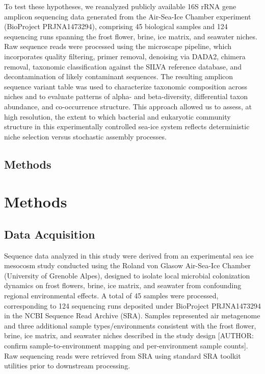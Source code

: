 \documentclass[
  11pt,
]{article}
\begin{document}
To test these hypotheses, we reanalyzed publicly available 16S rRNA gene
amplicon sequencing data generated from the Air-Sea-Ice Chamber
experiment (BioProject PRJNA1473294), comprising 45 biological samples
and 124 sequencing runs spanning the frost flower, brine, ice matrix,
and seawater niches. Raw sequence reads were processed using the
microscape pipeline, which incorporates quality filtering, primer
removal, denoising via DADA2, chimera removal, taxonomic classification
against the SILVA reference database, and decontamination of likely
contaminant sequences. The resulting amplicon sequence variant table was
used to characterize taxonomic composition across niches and to evaluate
patterns of alpha- and beta-diversity, differential taxon abundance, and
co-occurrence structure. This approach allowed us to assess, at high
resolution, the extent to which bacterial and eukaryotic community
structure in this experimentally controlled sea-ice system reflects
deterministic niche selection versus stochastic assembly processes.

\subsection{Methods}\label{methods}

\section{Methods}\label{methods-1}

\subsection{Data Acquisition}\label{data-acquisition}

Sequence data analyzed in this study were derived from an experimental
sea ice mesocosm study conducted using the Roland von Glasow Air-Sea-Ice
Chamber (University of Grenoble Alpes), designed to isolate local
microbial colonization dynamics on frost flowers, brine, ice matrix, and
seawater from confounding regional environmental effects. A total of 45
samples were processed, corresponding to 124 sequencing runs deposited
under BioProject PRJNA1473294 in the NCBI Sequence Read Archive (SRA).
Samples represented air metagenome and three additional sample
types/environments consistent with the frost flower, brine, ice matrix,
and seawater niches described in the study design {[}AUTHOR: confirm
sample-to-environment mapping and per-environment sample counts{]}. Raw
sequencing reads were retrieved from SRA using standard SRA toolkit
utilities prior to downstream processing.
\end{document}
